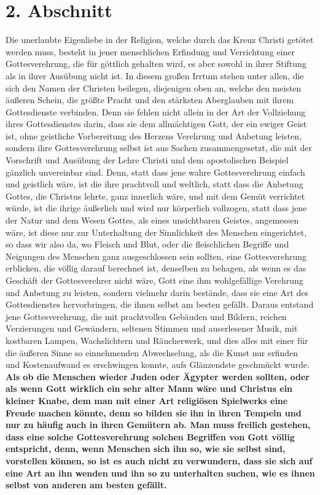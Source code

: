 \section{2. Abschnitt} \label{kap5_ab2}

Die unerlaubte Eigenliebe in der Religion, welche durch das Kreuz Christi
getötet werden muss, besteht in jener menschlichen Erfindung und Verrichtung
einer Gottesverehrung, die für göttlich gehalten wird, es aber sowohl in ihrer
Stiftung als in ihrer Ausübung nicht ist. In diesem großen Irrtum stehen unter
allen, die sich den Namen der Christen beilegen, diejenigen oben an, welche den
meisten äußeren Schein, die größte Pracht und den stärksten Aberglauben mit
ihrem Gottesdienste verbinden. Denn sie fehlen nicht allein in der Art der
Vollziehung ihres Gottesdienstes darin, dass sie dem allmächtigen Gott, der ein
ewiger Geist ist, ohne geistliche Vorbereitung
des Herzens Verehrung und
Anbetung leisten, sondern ihre Gottesverehrung selbst ist aus Sachen
zusammengesetzt, die mit der Vorschrift und Ausübung der Lehre Christi und dem
apostolischen Beispiel gänzlich unvereinbar sind. Denn, statt dass jene wahre
Gottesverehrung einfach und geistlich wäre, ist die ihre prachtvoll und
weltlich, statt dass die Anbetung Gottes, die Christus lehrte, ganz innerlich
wäre, und mit dem Gemüt verrichtet würde, ist die ihrige äußerlich und wird
nur körperlich vollzogen, statt dass jene der Natur und dem Wesen Gottes, als
eines unsichtbaren Geistes, angemessen wäre, ist diese nur zur Unterhaltung der
Sinnlichkeit des Menschen eingerichtet, so dass wir also da, wo Fleisch und
Blut,
oder die fleischlichen Begriffe und Neigungen des Menschen ganz ausgeschlossen
sein sollten, eine Gottesverehrung erblicken, die völlig darauf berechnet ist,
denselben zu behagen, als wenn es das Geschäft der Gottesverehrer nicht wäre,
Gott eine ihm wohlgefällige Verehrung und Anbetung zu leisten, sondern vielmehr
darin bestände, dass sie eine Art des Gottesdienstes hervorbringen, die ihnen
selbst am besten gefällt. Daraus entstand jene Gottesverehrung, die mit
prachtvollen Gebäuden und Bildern, reichen Verzierungen und Gewändern, seltenen
Stimmen und auserlesener Musik, mit kostbaren Lampen,
Wachslichtern und
Räucherwerk, und dies alles mit einer für die äußeren Sinne
so
einnehmenden
Abwechselung, als die Kunst nur erfinden und Kostenaufwand es erschwingen
konnte, aufs Glänzendste geschmückt wurde. \label{ref:05_02_kasperletheater}
\textbf{Als ob die Menschen wieder Juden
oder Ägypter werden sollten,
oder als wenn Gott wirklich ein sehr alter Mann
wäre und Christus ein kleiner Knabe, dem man mit einer Art religiösen
Spielwerks eine Freude machen könnte, denn so bilden sie ihn in ihren Tempeln
und nur zu häufig auch in ihren Gemütern ab. Man muss freilich gestehen, dass
eine solche Gottesverehrung solchen Begriffen von Gott völlig entspricht, denn,
wenn Menschen sich ihn so, wie sie selbst sind, vorstellen können, so ist es
auch nicht zu verwundern, dass sie sich auf eine Art an ihn wenden und ihn so
zu
unterhalten suchen, wie es ihnen selbst von anderen am besten gefällt.}


